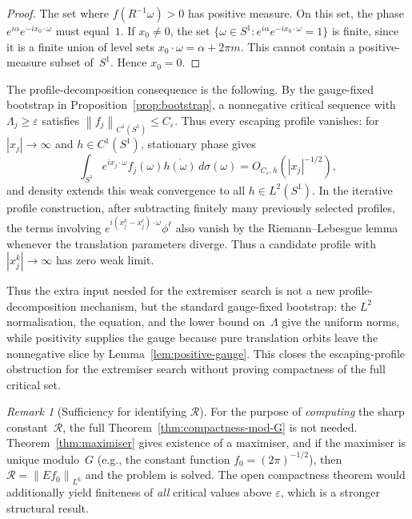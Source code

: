 \documentclass[12pt]{article}
\theoremstyle{definition}
\theoremstyle{remark}
\newtheorem{remark}[theorem]{Remark}
\newcommand{\norm}[1]{\left\|#1\right\|}
\begin{document}
\begin{proof}
  The set where $f(R^{-1}\omega)>0$ has positive measure.  On this set,
  the phase $e^{i\alpha}e^{-ix_0\cdot\omega}$ must equal~$1$.  If
  $x_0\neq 0$, the set
  $\{\omega\in S^1:e^{i\alpha}e^{-ix_0\cdot\omega}=1\}$ is finite, since
  it is a finite union of level sets $x_0\cdot\omega=\alpha+2\pi m$.
  This cannot contain a positive-measure subset of~$S^1$.  Hence $x_0=0$.
\end{proof}

The profile-decomposition consequence is the following.  By the
gauge-fixed bootstrap in Proposition~\ref{prop:bootstrap}, a
nonnegative critical sequence with $\Lambda_j\geq\varepsilon$ satisfies
$\norm{f_j}_{C^1(S^1)}\leq C_\varepsilon$.  Thus every escaping profile
vanishes: for $|x_j|\to\infty$ and $h\in C^1(S^1)$, stationary phase gives
\[
  \int_{S^1} e^{ix_j\cdot\omega} f_j(\omega)\overline{h(\omega)}
  \,d\sigma(\omega)
  = O_{C_\varepsilon,h}(|x_j|^{-1/2}),
\]
and density extends this weak convergence to all $h\in L^2(S^1)$.  In the
iterative profile construction, after subtracting finitely many previously
selected profiles, the terms involving
$e^{i(x_j^k-x_j^\ell)\cdot\omega}\phi^\ell$ also vanish by the
Riemann--Lebesgue lemma whenever the translation parameters diverge.
Thus a candidate profile with $|x_j^k|\to\infty$ has zero weak limit.

Thus the extra input needed for the extremiser search is not a new
profile-decomposition mechanism, but the standard gauge-fixed bootstrap:
the $L^2$ normalisation, the equation, and the lower bound on~$\Lambda$
give the uniform norms, while positivity supplies the gauge because pure
translation orbits leave the nonnegative slice by
Lemma~\ref{lem:positive-gauge}.  This closes the escaping-profile
obstruction for the extremiser search without proving compactness of the
full critical set.

\begin{remark}[Sufficiency for identifying $\mathcal R$]
  \label{rem:sufficiency-max}
  For the purpose of \emph{computing} the sharp constant~$\mathcal R$,
  the full Theorem~\ref{thm:compactness-mod-G} is not needed.
  Theorem~\ref{thm:maximiser} gives existence of a maximiser, and if
  the maximiser is unique modulo~$G$ (e.g., the constant function
  $f_0=(2\pi)^{-1/2}$), then $\mathcal R=\norm{Ef_0}_{L^6}$ and
  the problem is solved.  The open compactness theorem would
  additionally yield finiteness of \emph{all} critical values above
  $\varepsilon$, which is a stronger structural result.
\end{remark}
\end{document}

